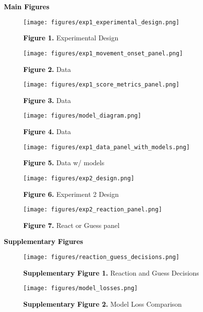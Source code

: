 \documentclass[12pt,letterpaper]{article}
\newcommand{\SethCaption}[2]{\noindent\textbf{\textcolor{black}{#1}} {#2}}
\newcommand{\SectionHeader}[1]{\noindent\textbf{\Large{\textcolor{black}{#1}}}\normalsize }
\begin{document}
\SectionHeader{Main Figures} 

\begin{figure}[H]
    \centering
    \texttt{[image: figures/exp1\_experimental\_design.png]}
    
    \SethCaption{Figure 1.}{Experimental Design}
\end{figure}
\begin{figure}[H]
    \centering
    \texttt{[image: figures/exp1\_movement\_onset\_panel.png]}
    
    \SethCaption{Figure 2.}{Data}
\end{figure}
\begin{figure}[H]
    \centering
    \texttt{[image: figures/exp1\_score\_metrics\_panel.png]}
    
    \SethCaption{Figure 3.}{Data}
\end{figure}

\begin{figure}[H]
    \centering
    \texttt{[image: figures/model\_diagram.png]}
    
    \SethCaption{Figure 4.}{Data}
\end{figure}
\begin{figure}[H]
    \centering
    \texttt{[image: figures/exp1\_data\_panel\_with\_models.png]}
    
    \SethCaption{Figure 5.}{Data w/ models}
\end{figure}

\begin{figure}[H]
    \centering
    \texttt{[image: figures/exp2\_design.png]}
    
    \SethCaption{Figure 6.}{Experiment 2 Design}
\end{figure}

\begin{figure}[H]
    \centering
    \texttt{[image: figures/exp2\_reaction\_panel.png]}
    
    \SethCaption{Figure 7.}{React or Guess panel}
\end{figure}

\SectionHeader{Supplementary Figures} 

\begin{figure}[H]
    \centering
    \texttt{[image: figures/reaction\_guess\_decisions.png]}
    
    \SethCaption{Supplementary Figure 1.}{Reaction and Guess Decisions}
\end{figure}

\begin{figure}[H]
    \centering
    \texttt{[image: figures/model\_losses.png]}
    
    \SethCaption{Supplementary Figure 2.}{Model Loss Comparison}
\end{figure}
\end{document}
